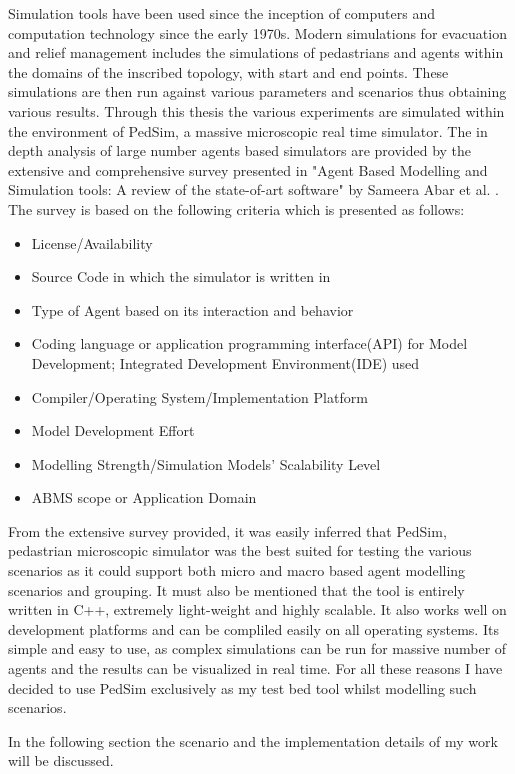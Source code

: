 Simulation tools have been used since the inception of computers and computation technology since the early 1970s. Modern simulations for evacuation and relief management includes the simulations of pedastrians and agents within the domains of the inscribed topology, with start and end points. These simulations are then run against various parameters and scenarios thus obtaining various results. Through this thesis the various experiments are simulated within the environment of PedSim, a massive microscopic real time simulator. The in depth analysis of large number agents based simulators are provided by the extensive and comprehensive survey presented in "Agent Based Modelling and Simulation tools: A review of the state-of-art software" by Sameera Abar et al. \cite{ref22}. The survey is based on the following criteria which is presented as follows:

\begin{itemize}
  \item License/Availability
  \item Source Code in which the simulator is written in
  \item Type of Agent based on its interaction and behavior
  \item Coding language or application programming interface(API) for Model Development; Integrated Development Environment(IDE) used
  \item Compiler/Operating System/Implementation Platform
  \item Model Development Effort
  \item Modelling Strength/Simulation Models' Scalability Level
  \item ABMS scope or Application Domain
\end{itemize} 

From the extensive survey provided, it was easily inferred that PedSim, pedastrian microscopic simulator was the best suited for testing the various scenarios as it could support both micro and macro based agent modelling scenarios and grouping. It must also be mentioned that the tool is entirely written in C++, extremely light-weight and highly scalable. It also works well on development platforms and can be compliled easily on all operating systems. Its simple and easy to use, as complex simulations can be run for massive number of agents and the results can be visualized in real time. For all these reasons I have decided to use PedSim exclusively as my test bed tool whilst modelling such scenarios. 

In the following section the scenario and the implementation details of my work will be discussed.
